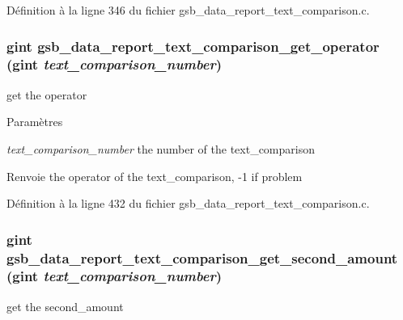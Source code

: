 Définition à la ligne 346 du fichier gsb\_\-data\_\-report\_\-text\_\-comparison.c.

\subsubsection[{gsb\_\-data\_\-report\_\-text\_\-comparison\_\-get\_\-operator}]{\setlength{\rightskip}{0pt plus 5cm}gint gsb\_\-data\_\-report\_\-text\_\-comparison\_\-get\_\-operator (gint {\em text\_\-comparison\_\-number})}\label{gsb__data__report__text__comparison_8h_a456a9c966f4efc5af7aadca4d09f1b2a}
get the operator


\begin{DoxyParams}{Paramètres}
\item[{\em text\_\-comparison\_\-number}]the number of the text\_\-comparison\end{DoxyParams}
\begin{DoxyReturn}{Renvoie}
the operator of the text\_\-comparison, -\/1 if problem 
\end{DoxyReturn}


Définition à la ligne 432 du fichier gsb\_\-data\_\-report\_\-text\_\-comparison.c.

\subsubsection[{gsb\_\-data\_\-report\_\-text\_\-comparison\_\-get\_\-second\_\-amount}]{\setlength{\rightskip}{0pt plus 5cm}gint gsb\_\-data\_\-report\_\-text\_\-comparison\_\-get\_\-second\_\-amount (gint {\em text\_\-comparison\_\-number})}\label{gsb__data__report__text__comparison_8h_aeb73733ca155c44e7991f967eea4205f}
get the second\_\-amount


